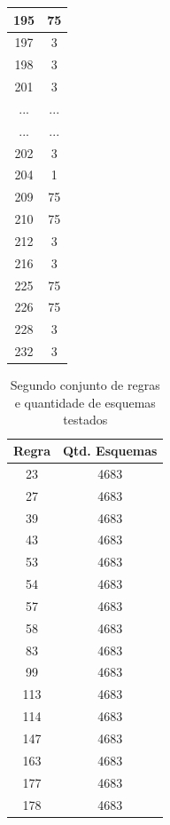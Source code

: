 \documentclass[a4paper,12pt]{ltxdoc}
\begin{document}
\begin{center}
\begin{longtable}{ | c | c | }
  195 & 75 \\ \hline
  197 & 3  \\ \hline
  198 & 3  \\ \hline
  201 & 3  \\ \hline
  ... & ... \\ \hline
  ... & ... \\ \hline
  202 & 3  \\ \hline
  204 & 1  \\ \hline
  209 & 75 \\ \hline
  210 & 75 \\ \hline
  212 & 3  \\ \hline
  216 & 3  \\ \hline
  225 & 75 \\ \hline
  226 & 75 \\ \hline
  228 & 3  \\ \hline
  232 & 3  \\ \hline
\end{longtable}
\end{center}


\begin{center}
  \begin{longtable}{ | c | c | } 
  \caption{Segundo conjunto de regras e quantidade de esquemas testados}\\
    \hline
    Regra & Qtd. Esquemas     	\\\hline
    23 & 4683 \\\hline
    27 & 4683 \\\hline
    39 & 4683 \\\hline
    43 & 4683 \\\hline
    53 & 4683 \\\hline
    54 & 4683 \\\hline
    57 & 4683 \\\hline
    58 & 4683 \\\hline
    83 & 4683 \\\hline
    99 & 4683 \\\hline
    113 & 4683 \\\hline
    114 & 4683 \\\hline
    147 & 4683 \\\hline
    163 & 4683 \\\hline
    177 & 4683 \\\hline
    178 & 4683 \\\hline
  \end{longtable}
\end{center}
\end{document}
